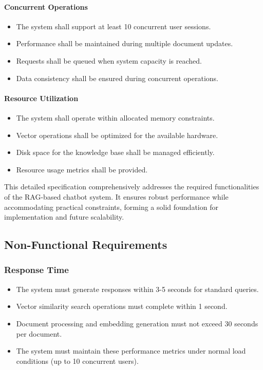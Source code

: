 \documentclass[12pt,a4paper]{report}
\begin{document}
\paragraph{Concurrent Operations}
\begin{itemize}
    \item The system shall support at least 10 concurrent user sessions.
    \item Performance shall be maintained during multiple document updates.
    \item Requests shall be queued when system capacity is reached.
    \item Data consistency shall be ensured during concurrent operations.
\end{itemize}

\paragraph{Resource Utilization}
\begin{itemize}
    \item The system shall operate within allocated memory constraints.
    \item Vector operations shall be optimized for the available hardware.
    \item Disk space for the knowledge base shall be managed efficiently.
    \item Resource usage metrics shall be provided.
\end{itemize}

This detailed specification comprehensively addresses the required functionalities of the RAG-based chatbot system. It ensures robust performance while accommodating practical constraints, forming a solid foundation for implementation and future scalability.

\subsection{Non-Functional Requirements}

\subsubsection{Response Time}
\begin{itemize}
    \item The system must generate responses within 3-5 seconds for standard queries.
    \item Vector similarity search operations must complete within 1 second.
    \item Document processing and embedding generation must not exceed 30 seconds per document.
    \item The system must maintain these performance metrics under normal load conditions (up to 10 concurrent users).
\end{itemize}
\end{document}
